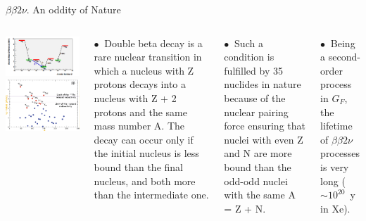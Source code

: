 \documentclass [aspectratio=169]{beamer}
\begin{document}

\begin{frame}{$\beta\beta2\nu$. An oddity of Nature}

\begin{columns}
\includegraphics[scale=0.40]{xebb2nu.png}
\includegraphics[scale=0.40]{betabetaisotopes.png}


$\bullet~$ Double beta decay is a rare nuclear transition in which a nucleus with Z protons decays into a nucleus with Z + 2 protons and the same mass number A. The decay can occur only if the initial nucleus is less bound than the final nucleus, and both more than the intermediate one.

$\bullet~$ Such a condition is fulfilled by 35 nuclides in nature because of the nuclear pairing force ensuring that nuclei with even Z and N are more bound than the odd-odd nuclei with the same A = Z + N.

$\bullet~$ Being a second-order process in $G_F$, the lifetime of $\beta\beta2\nu$ processes is very long ($\sim 10^{20}$~y in Xe).
 
\end{columns}
\end{frame}
\end{document}
